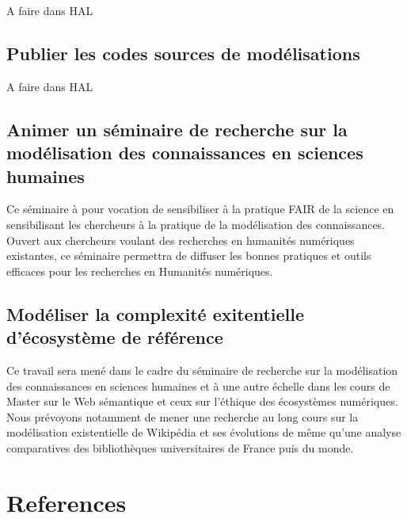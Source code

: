 \documentclass[
  a4paper,
  DIV=11,
  numbers=noendperiod]{scrreprt}
\begin{document}
A faire dans HAL

\section{Publier les codes sources de
modélisations}\label{publier-les-codes-sources-de-moduxe9lisations}

A faire dans HAL

\section{Animer un séminaire de recherche sur la modélisation des
connaissances en sciences
humaines}\label{animer-un-suxe9minaire-de-recherche-sur-la-moduxe9lisation-des-connaissances-en-sciences-humaines}

Ce séminaire à pour vocation de sensibiliser à la pratique FAIR de la
science en sensibilisant les chercheurs à la pratique de la modélisation
des connaissances. Ouvert aux chercheurs voulant des recherches en
humanités numériques existantes, ce séminaire permettra de diffuser les
bonnes pratiques et outils efficaces pour les recherches en Humanités
numériques.

\section{Modéliser la complexité exitentielle d'écosystème de
référence}\label{sec-modeliserEcosystemeReference}

Ce travail sera mené dans le cadre du séminaire de recherche sur la
modélisation des connaissances en sciences humaines et à une autre
échelle dans les cours de Master sur le Web sémantique et ceux sur
l'éthique des écosystèmes numériques. Nous prévoyons notamment de mener
une recherche au long cours sur la modélisation existentielle de
Wikipédia et ses évolutions de même qu'une analyse comparatives des
bibliothèques universitaires de France puis du monde.


\chapter*{References}\label{references}

\end{document}
